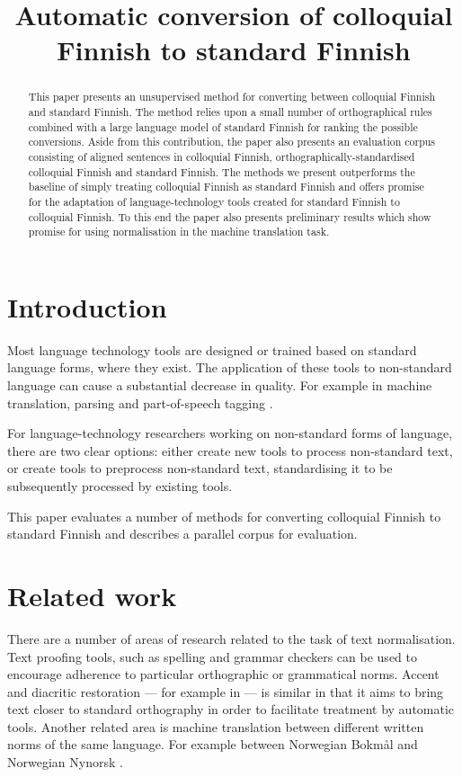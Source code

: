 \documentclass[11pt]{article}
\title{Automatic conversion of colloquial Finnish to standard Finnish}
\author{}
\date{}
\begin{document}
\maketitle
\begin{abstract}
  This paper presents an unsupervised method for converting between colloquial Finnish
  and standard Finnish. The method relies upon a small number of orthographical rules
  combined with a large language model of standard Finnish for ranking the possible 
  conversions. Aside from this contribution, the paper also presents an evaluation
  corpus consisting of aligned sentences in colloquial Finnish, orthographically-standardised
  colloquial Finnish and standard Finnish. The methods we present outperforms the baseline
  of simply treating colloquial Finnish as standard Finnish and offers promise for the adaptation
  of language-technology tools created for standard Finnish to colloquial Finnish. To this end
  the paper also presents preliminary results which show promise for using normalisation in 
  the machine translation task.
\end{abstract}

\section{Introduction}

Most language technology tools are designed or trained based on standard language 
forms, where they exist. The application of these tools to non-standard
language can cause a substantial decrease in quality. For example in machine translation,
parsing and part-of-speech tagging \cite{eisenstein2013}.

For language-technology researchers working on non-standard forms of language, there are 
two clear options: either create new tools to process non-standard text,
  or create tools to preprocess non-standard text, standardising it to be subsequently processed
 by existing tools.

This paper evaluates a number of methods for converting colloquial Finnish to 
standard Finnish and describes a parallel corpus for evaluation.

\section{Related work}

There are a number of areas of research related to the task of text normalisation. Text
proofing tools, such as spelling and grammar checkers \cite{kukich1992} can be used to encourage adherence
to particular orthographic or grammatical norms. Accent and diacritic restoration --- for example in  --- is similar
in that it aims to bring text closer to standard orthography in order to facilitate treatment by 
automatic tools. Another related area is machine translation between different written norms of 
the same language. For example between Norwegian Bokm\aa{}l and Norwegian Nynorsk \cite{unhammer2009}.
\end{document}
